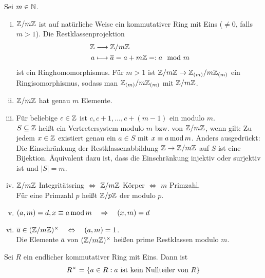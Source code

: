 \begin{falko} \label{F3.6}
	Sei $m \in \mathbb{N}$. 
	\begin{enumerate}[(i)]
		\item $\mathbb{Z}/m\mathbb{Z}$ ist auf natürliche Weise ein kommutativer Ring mit Eins ($\neq 0$, falls $m > 1$). Die Restklassenprojektion
		\begin{equation}
		\begin{aligned}
			\mathbb{Z} &\longrightarrow \mathbb{Z}/m\mathbb{Z} \\
			a &\longmapsto \overline{a} = a+m\mathbb{Z} =: a \mod m
		\end{aligned}
		\end{equation}
		ist ein Ringhomomorphismus. Für $m > 1$ ist $\mathbb{Z}/m\mathbb{Z} \rightarrow \mathbb{Z}_{(m)}/m\mathbb{Z}_{(m)}$ ein Ringisomorphismus, sodass man $\mathbb{Z}_{(m)}/m\mathbb{Z}_{(m)}$ mit $\mathbb{Z}/m\mathbb{Z}$.
		\item $\mathbb{Z}/m\mathbb{Z}$ hat genau $m$ Elemente.
		\item Für beliebige $c \in \mathbb{Z}$ ist $c, c+1, \dots, c+(m-1)$ ein  modulo $m$. \\
		$S \subseteq \mathbb{Z}$ heißt ein Vertretersystem modulo $m$ bzw. von $\mathbb{Z}/m\mathbb{Z}$, wenn gilt: Zu jedem $x \in \mathbb{Z}$ existiert genau ein $a \in S$ mit $x \equiv a \operatorname{mod} m$. Anders ausgedrückt: Die Einschränkung der Restklassenabbildung $\mathbb{Z} \rightarrow \mathbb{Z}/m\mathbb{Z}$ auf $S$ ist eine Bijektion. Äquivalent dazu ist, dass die Einschränkung injektiv oder surjektiv ist und $|S|=m$.
		\item $\mathbb{Z}/m\mathbb{Z}$ Integritätsring \quad $\Leftrightarrow$ \quad $\mathbb{Z}/m\mathbb{Z}$ Körper \quad $\Leftrightarrow$ \quad $m$ Primzahl. \\
		Für eine Primzahl $p$ heißt $\mathbb{Z}/p\mathbb{Z}$ der  modulo $p$.
		\item $(a,m) = d, x \equiv a \operatorname{mod} m \quad \Rightarrow \quad (x,m) = d$
		\item $\overline{a} \in (\mathbb{Z}/m\mathbb{Z})^\times \quad \Leftrightarrow \quad (a,m) = 1$. \\
		Die Elemente $\overline{a}$ von $(\mathbb{Z}/m\mathbb{Z})^\times$ heißen prime Restklassen modulo $m$.
	\end{enumerate}
\end{falko}

\begin{lemma}
	Sei $R$ ein endlicher kommutativer Ring mit Eins. Dann ist
	\[ R^\times = \{a \in R : a \text{ ist kein Nullteiler von } R\} \]
\end{lemma}

